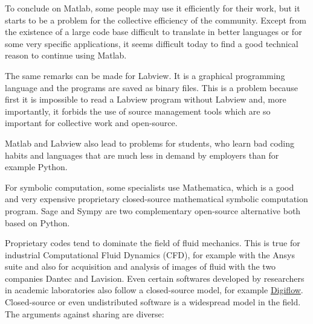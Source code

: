 To conclude on Matlab, some people may use it efficiently for their work, but it
starts to be a problem for the collective efficiency of the community. Except
from the existence of a large code base difficult to translate in better
languages or for some very specific applications, it seems difficult today to
find a good technical reason to continue using Matlab.

The same remarks can be made for Labview. It is a graphical programming
language and the programs are saved as binary files. This is a problem because
first it is impossible to read a Labview program without Labview and, more
importantly, it forbids the use of source management tools which are so
important for collective work and open-source.

Matlab and Labview also lead to problems for students, who learn bad coding
habits and languages that are much less in demand by employers than for example
Python.

For symbolic computation, some specialists use Mathematica, which is a good and
very expensive proprietary closed-source mathematical symbolic computation
program.
%
Sage and Sympy are two complementary open-source alternative both based on
Python.



Proprietary codes tend to dominate the field of fluid mechanics. This is true
for industrial Computational Fluid Dynamics (CFD), for example with the Ansys
suite and also for acquisition and analysis of images of fluid with the
two companies Dantec and Lavision.
%
Even certain softwares developed by researchers in academic laboratories
also follow a closed-source model, for example
\href{http://www.damtp.cam.ac.uk/user/fdl/digiflow/index.htm}{Digiflow}.
%
Closed-source or even undistributed software is a widespread model in the
field.
%
The arguments against sharing are diverse:

